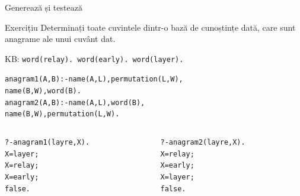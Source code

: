 \documentclass[xcolor=x11names,compress,10pt]{beamer}
\begin{document}
\begin{frame}{Generează și testează}
\vspace*{0.3cm}

\begin{center}
\end{center}

\begin{block}{Exercițiu}
Determinați toate cuvintele dintr-o bază de 
cunoștințe dată, care sunt anagrame ale unui
 cuvânt dat.
\medskip

KB: \texttt{word(relay). word(early). word(layer).}
\medskip

\pause
\begin{alltt}
anagram1(A,B) :- name(A,L), permutation(L,W), \\
\hspace*{3cm} name(B,W), word(B).\\ \pause
anagram2(A,B) :-  name(A,L), word(B), \\
\hspace*{3cm} name(B,W),  permutation(L,W).\\
\end{alltt}
\pause

\begin{columns}
\begin{column}{0.45\textwidth}
\begin{alltt}
?- anagram1(layre,X).\\
X = layer ;\\
X = relay ;\\
X = early ;\\
\alert{false.}
\end{alltt}
\end{column}
\begin{column}{0.45\textwidth}
\begin{alltt}
?- anagram2(layre,X).\\
X = relay ;\\
X = early ;\\
X = layer ;\\
\alert{false.}
\end{alltt}
\end{column}
\end{columns}
\end{block}
\end{frame}
\end{document}
